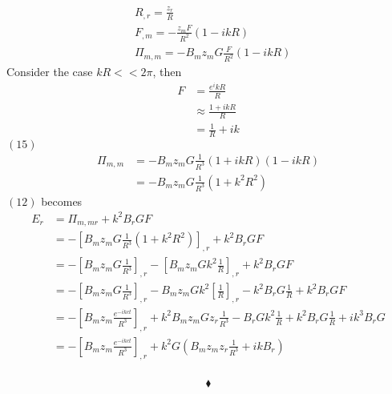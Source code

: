 \begin{align}
&R_{,r} = \frac{z_r}{R}\\
&F_{,m} = -\frac{z_mF}{R^2}\left(1-ikR\right)\\
&\Pi_{m,m} = -B_mz_mG\frac{F}{R^2}\left(1-ikR\right)
\end{align}
Consider the case $kR<< 2\pi$, then 
\begin{align}
F&= \frac{e^ikR}{R}\\
&\approx \frac{1+ikR}{R}\\
&=\frac{1}{R}+ik
\end{align}
$(15)$
\begin{align}
\Pi_{m,m} &= -B_mz_mG\frac{1}{R^3}\left(1+ikR\right)\left(1-ikR\right)\\
 &= -B_mz_mG\frac{1}{R^3}\left(1+k^2R^2\right)
\end{align}
$(12)$ becomes
\begin{align}
E_r&= \Pi_{m,mr}+k^2B_rGF\\
&= -\left[B_mz_mG\frac{1}{R^3}\left(1+k^2R^2\right)\right]_{,r}+k^2B_rGF\\
&= -\left[B_mz_mG\frac{1}{R^3}\right]_{,r}-\left[B_mz_mGk^2\frac{1}{R}\right]_{,r}+k^2B_rGF\\
&= -\left[B_mz_mG\frac{1}{R^3}\right]_{,r}-B_mz_mGk^2\left[\frac{1}{R}\right]_{,r}-k^2B_rG\frac{1}{R}+k^2B_rGF\\
&= -\left[B_mz_m\frac{e^{-ikct}}{R^3}\right]_{,r}+k^2B_mz_mGz_r\frac{1}{R^3}-B_rGk^2\frac{1}{R}+k^2B_rG\frac{1}{R}+ik^3B_rG\\
&= -\left[B_mz_m\frac{e^{-ikct}}{R^3}\right]_{,r}+k^2G\left(B_mz_mz_r\frac{1}{R^3}+ikB_r\right)\\
\end{align}

$$\blacklozenge$$
\newpage




